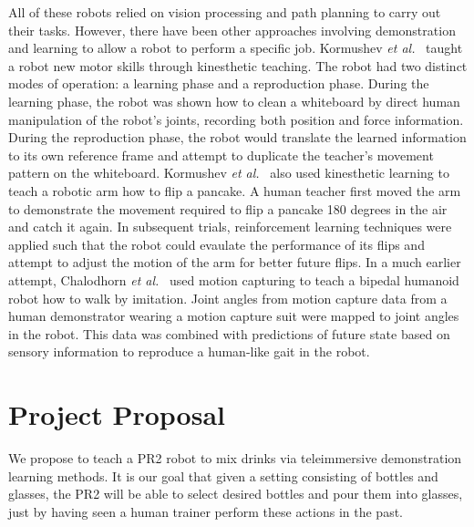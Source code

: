 \documentclass{sig-alternate}
\begin{document}
All of these robots relied on vision processing and path planning to carry out their tasks. However, there have been other approaches involving demonstration and learning to allow a robot to perform a specific job. Kormushev \textit{et al.}~\cite{walk_imitation} taught a robot new motor skills through kinesthetic teaching. The robot had two distinct modes of operation: a learning phase and a reproduction phase. During the learning phase, the robot was shown how to clean a whiteboard by direct human manipulation of the robot's joints, recording both position and force information. During the reproduction phase, the robot would translate the learned information to its own reference frame and attempt to duplicate the teacher's movement pattern on the whiteboard.  Kormushev \textit{et al.}~\cite{pancakes} also used kinesthetic learning to teach a robotic arm how to flip a pancake. A human teacher first moved the arm to demonstrate the movement required to flip a pancake 180 degrees in the air and catch it again. In subsequent trials, reinforcement learning techniques were applied such that the robot could evaulate the performance of its flips and attempt to adjust the motion of the arm for better future flips. In a much earlier attempt, Chalodhorn \textit{et al.}~\cite{walk_imitation} used motion capturing to teach a bipedal humanoid robot how to walk by imitation. Joint angles from motion capture data from a human demonstrator wearing a motion capture suit were mapped to joint angles in the robot. This data was combined with predictions of future state based on sensory information to reproduce a human-like gait in the robot. 

\section{Project Proposal}
\label{sec:project_proposal}We propose to teach a PR2 robot to mix drinks via
teleimmersive demonstration learning methods. It is our goal that given a 
setting consisting of bottles and glasses, the PR2 will be able to select
desired bottles and pour them into glasses, just by having seen a human
trainer perform these actions in the past.
\end{document}
